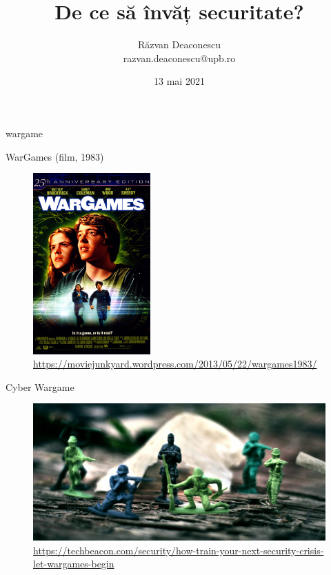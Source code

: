 \documentclass{simple}
\title[De ce securitate?]{De ce să învăț securitate?}
\institute{Talks by Softbinator (\#149)}
\author[Răzvan Deaconescu]{Răzvan Deaconescu \\
razvan.deaconescu@upb.ro}
\date{13 mai 2021}
\begin{document}
\frame{\titlepage}

\begin{frame}{}
  \centering
  \LARGE
  wargame
\end{frame}

\begin{frame}{WarGames (film, 1983)}
  \begin{figure}
    \centering
    \includegraphics[width=0.4\textwidth]{img/wargames-film.jpg} \\
    \tiny{\url{https://moviejunkyard.wordpress.com/2013/05/22/wargames1983/}}
  \end{figure}
\end{frame}

\begin{frame}{Cyber Wargame}
  \begin{figure}
    \centering
    \includegraphics[width=\textwidth]{img/cyber-wargame.jpg} \\
    \tiny{\url{https://techbeacon.com/security/how-train-your-next-security-crisis-let-wargames-begin}}
  \end{figure}
\end{frame}
\end{document}
